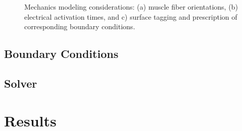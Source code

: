 \begin{figure}[ht]
{\label{fig:supp3}}
%
\caption{Mechanics modeling considerations: (a) muscle fiber orientations, (b) electrical activation times, and c) surface tagging and prescription of corresponding boundary conditions.}
\label{fig:supp}
\end{figure}

\subsection{Boundary Conditions}
\label{Boundary Conditions}

\subsection{Solver}
\label{Solver}

\section{Results}
\label{Results}


